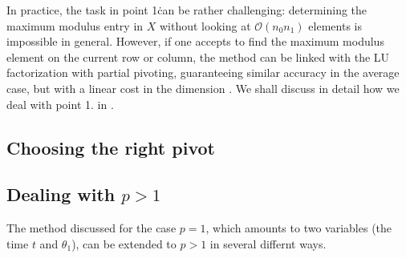 \documentclass[]{article}
\begin{document}
In practice, the task in point 1\. can be rather challenging: determining the
maximum modulus entry in $X$ without looking at $\mathcal O(n_0 n_1)$ 
elements is impossible in general. However, if one 
accepts to find the maximum modulus element on the current row 
or column, the method can be linked with the LU factorization 
with partial pivoting, guaranteeing similar accuracy 
in the average case, but with a linear 
cost in the dimension \cite{bebendorf2003adaptive}. 
We shall discuss in detail how we deal with
point 1. in . 

\subsection{Choosing the right pivot}
\label{sec:pivot-choice}



\subsection{Dealing with $p > 1$}
\label{eq:pgt1}

The method discussed for the case $p = 1$, which amounts to 
two variables (the time $t$ and $\theta_1$), can be extended 
to $p > 1$ in several differnt ways. 



\end{document}
